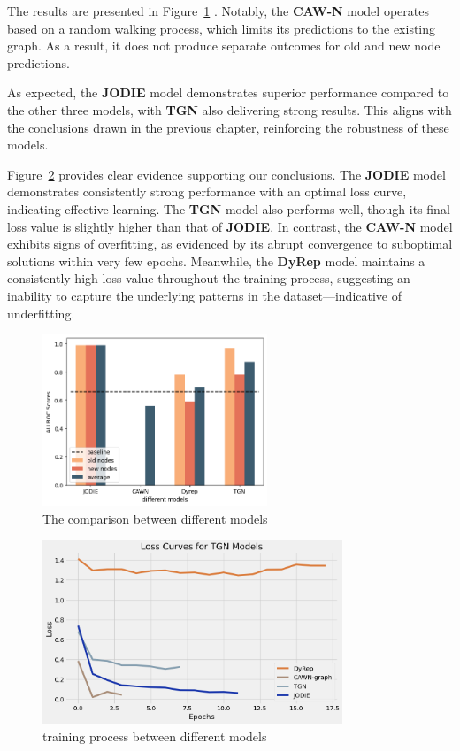 The results are presented in Figure~\ref{fig:comparison} . Notably, the \textbf{CAW-N} model operates based on a random walking process, which limits its predictions to the existing graph. As a result, it does not produce separate outcomes for old and new node predictions.

As expected, the \textbf{JODIE} model demonstrates superior performance compared to the other three models, with \textbf{TGN} also delivering strong results. This aligns with the conclusions drawn in the previous chapter, reinforcing the robustness of these models.

Figure~\ref{fig:loss_comparison} provides clear evidence supporting our conclusions. The \textbf{JODIE} model demonstrates consistently strong performance with an optimal loss curve, indicating effective learning. The \textbf{TGN} model also performs well, though its final loss value is slightly higher than that of \textbf{JODIE}. In contrast, the \textbf{CAW-N} model exhibits signs of overfitting, as evidenced by its abrupt convergence to suboptimal solutions within very few epochs. Meanwhile, the \textbf{DyRep} model maintains a consistently high loss value throughout the training process, suggesting an inability to capture the underlying patterns in the dataset—indicative of underfitting.

\begin{figure}[h]
    \centering
    \includegraphics[width=0.6\textwidth]{figures/05_different_model_selection.png}
    \caption{The comparison between different models}
    \label{fig:comparison}
\end{figure}

\begin{figure}
    \centering
    \includegraphics[width=0.8\textwidth]{figures/05_model_loss.png}
    \caption{training process between different models}
    \label{fig:loss_comparison}
\end{figure}

